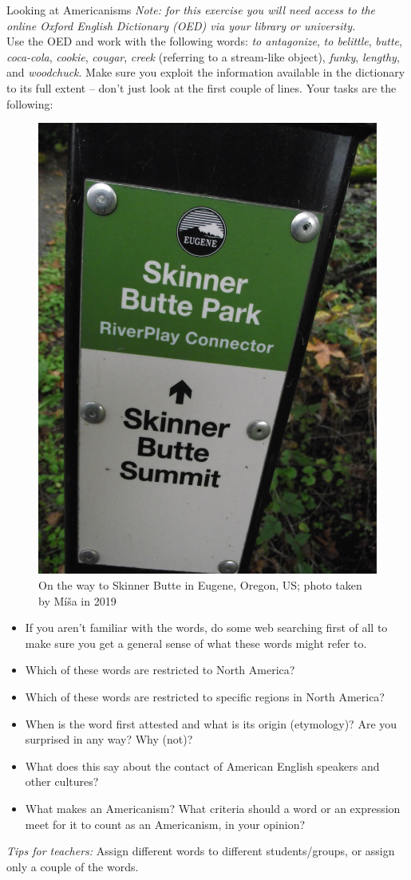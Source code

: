 \begin{exercises}{Looking at Americanisms}\label{exercise-Amer}
\emph{Note: for this exercise you will need access to the online Oxford English Dictionary (OED) via your library or university.}\\

\noindent Use the OED and work with the following words: \textit{to antagonize}, \textit{to belittle}, \textit{butte},  \textit{coca-cola}, \textit{cookie}, \textit{cougar}, \textit{creek} (referring to a stream-like object), \textit{funky}, \textit{lengthy}, and \textit{woodchuck}. Make sure you exploit the information available in the dictionary to its full extent -- don't just look at the first couple of lines. Your tasks are the following:

\begin{figure}[H]
    \includegraphics[width=.3\textwidth]{chapters/img/Skinner_Butte.JPG}
    \caption{On the way to Skinner Butte in Eugene, Oregon, US; photo taken by Míša in 2019}
    \label{fig:SkinnerButte}
\end{figure}


\begin{itemize}
\item If you aren't familiar with the words, do some web searching first of all to make sure you get a general sense of what these words might refer to.
\item Which of these words are restricted to North America?
\item Which of these words are restricted to specific regions in North America?
\item When is the word first attested and what is its origin (etymology)? Are you surprised in any way? Why (not)?
\item What does this say about the contact of American English speakers and other cultures?
\item What makes an Americanism? What criteria should a word or an expression meet for it to count as an Americanism, in your opinion?
\end{itemize}


\noindent \emph{Tips for teachers:} Assign different words to different students/groups, or assign only a couple of the words.
\end{exercises}

